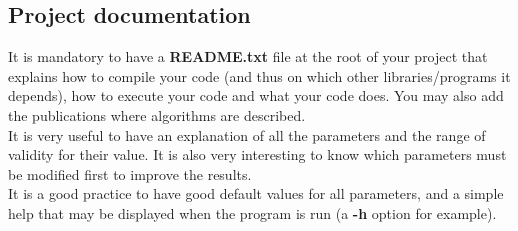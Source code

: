 \subsection{Project documentation}
It is mandatory to have a {\bf README.txt} file at the root of your
project that explains how to compile your code (and thus on which
other libraries/programs it depends), how to execute your code and
what your code does. You may also add the publications where
algorithms are described.\\ It is very useful to have an explanation
of all the parameters and the range of validity for their value. It is
also very interesting to know which parameters must be modified first
to improve the results.\\ It is a good practice to have good default
values for all parameters, and a simple help that may be displayed
when the program is run (a {\bf -h} option for example).
